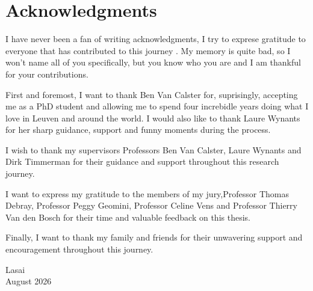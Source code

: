 \chapter*{Acknowledgments}

I have never been a fan of writing acknowledgments, I try to exprese gratitude to everyone that has contributed to this journey . My memory is quite bad, so I won't name all of you specifically, but you know who you are and I am thankful for your contributions. 

First and foremost, I want to thank Ben Van Calster for, suprisingly, accepting me as a PhD student and allowing me to spend four increbidle years doing what I love in Leuven and around the world. I would also like to thank Laure Wynants for her sharp guidance, support and funny moments during the process.

I wish to thank my supervisors Professors Ben Van Calster, Laure Wynants and Dirk Timmerman for their guidance and support throughout this research journey. 

I want to express my gratitude to the members of my jury,Professor Thomas Debray, Professor Peggy Geomini, Professor Celine Vens and Professor Thierry Van den Bosch for their time and valuable feedback on this thesis.




Finally, I want to thank my family and friends for their unwavering support and encouragement throughout this journey.





{\raggedleft
Lasai \\
August 2026 \\
}